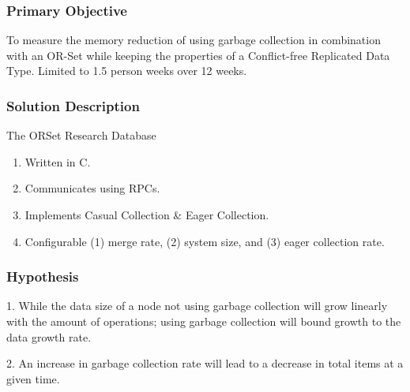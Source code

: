 \documentclass{beamer}
\begin{document}
    \begin{frame}[shrink]
        \frametitle{Primary Objective}
        \begin{center}
        \begin{minipage}{4in}
         To measure the memory reduction of using garbage collection in
         combination with an OR-Set while keeping the properties of a
         Conflict-free Replicated Data Type. Limited to 1.5 person
         weeks over 12 weeks.
        \end{minipage}
        \end{center}
    \end{frame}

    \begin{frame}
        \frametitle{Solution Description}
        The ORSet Research Database

        \begin{enumerate}
        \item Written in C.
        \item Communicates using RPCs.
        \item Implements Casual Collection \& Eager Collection.
        \item Configurable (1) merge rate, (2) system size, and (3) eager
            collection rate.
        \end{enumerate}
    \end{frame}

    \begin{frame}[shrink]
        \frametitle{Hypothesis}
        \begin{center}
        \begin{minipage}{4in}
        1. While the data size of a node not using garbage collection
        will grow linearly with the amount of operations; using garbage
        collection will bound growth to the data growth rate.

        \bigskip

        2. An increase in garbage collection rate will lead to a
        decrease in total items at a given time.
        \end{minipage}
        \end{center}
    \end{frame}
\end{document}
